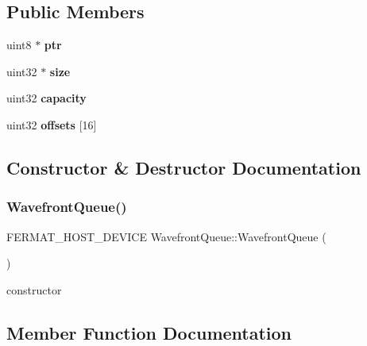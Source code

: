 \subsection*{Public Members}
\begin{DoxyCompactItemize}
\item 
\mbox{\label{struct_wavefront_queue_a3b193994354ff57ba61d03dcc41d6edf}} 
uint8 $\ast$ {\bfseries ptr}
\item 
\mbox{\label{struct_wavefront_queue_ab9460d5193b04937fc3978f2d2996199}} 
uint32 $\ast$ {\bfseries size}
\item 
\mbox{\label{struct_wavefront_queue_a4e2a9af43df8fa3648b5a7d5e13339e0}} 
uint32 {\bfseries capacity}
\item 
\mbox{\label{struct_wavefront_queue_a3cb9d06781ec50bc15172f54e003bdd0}} 
uint32 {\bfseries offsets} \mbox{[}16\mbox{]}
\end{DoxyCompactItemize}


\subsection{Constructor \& Destructor Documentation}
\mbox{\label{struct_wavefront_queue_a72e7cde3303ee1b9e5feefe1e9509d7b}} 
\subsubsection{\texorpdfstring{Wavefront\+Queue()}{WavefrontQueue()}}
{\footnotesize\ttfamily F\+E\+R\+M\+A\+T\+\_\+\+H\+O\+S\+T\+\_\+\+D\+E\+V\+I\+CE Wavefront\+Queue\+::\+Wavefront\+Queue (\begin{DoxyParamCaption}{ }\end{DoxyParamCaption})\hspace{0.3cm}{\ttfamily [inline]}}

constructor 

\subsection{Member Function Documentation}
\mbox{\label{struct_wavefront_queue_ae6763ab00a424dd1dbfe10f489ca1bb2}} 

